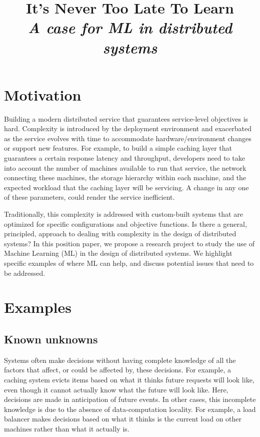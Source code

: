 \documentclass[a4paper,twocolumn]{article}
\title{
  It's Never Too Late To Learn\\
  \emph{A case for ML in distributed systems}
}
\author{}
\date{}
\begin{document}
\maketitle

\section{Motivation}

Building a modern distributed service that guarantees service-level objectives
is hard. Complexity is introduced by the deployment environment and exacerbated
as the service evolves with time to accommodate hardware/environment changes or
support new features.
For example, to build a simple caching layer that guarantees a certain response
latency and throughput, developers need to take into account the number of
machines available to run that service, the network connecting these machines,
the storage hierarchy within each machine, and the expected workload that the
caching layer will be servicing. A change in any one of these parameters, could
render the service inefficient.

Traditionally, this complexity is addressed with custom-built systems that
are optimized for specific configurations and objective functions. Is there a
general, principled, approach to dealing with complexity in the design of
distributed systems?
In this position paper, we propose a research project to study the use of
Machine Learning (ML) in the design of distributed systems. We highlight
specific examples of where ML can help, and discuss potential issues that need
to be addressed.


\section{Examples}

\subsection{Known unknowns}
Systems often make decisions without having complete knowledge of all the
factors that affect, or could be affected by, these decisions.  For example, a
caching system evicts items based on what it thinks future requests will look
like, even though it cannot actually know what the future will look like. Here,
decisions are made in anticipation of future events.  In other cases, this
incomplete knowledge is due to the absence of data-computation locality. For
example, a load balancer makes decisions based on what it thinks is the current
load on other machines rather than what it actually is.
\end{document}
